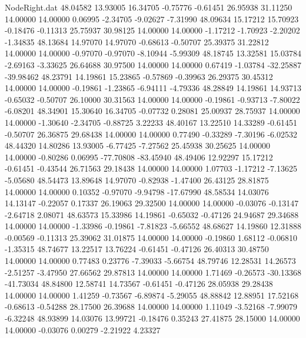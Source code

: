 \begin{filecontents}{NodeRight.dat}
  48.04582   13.93005   16.34705    -0.75776   -0.61451   26.95938   31.11250   14.00000   14.00000    0.06995   -2.34705   -9.02627   -7.31990
  48.09634   15.17212   15.70923    -0.18476   -0.11313   25.75937   30.98125   14.00000   14.00000   -1.17212   -1.70923   -2.20202   -1.34835
  48.13684   14.97070   14.97070    -0.68613   -0.50707   25.39375   31.22812   14.00000   14.00000   -0.97070   -0.97070   -8.10944   -5.99309
  48.18745   13.32581   15.03784    -2.69163   -3.33625   26.64688   30.97500   14.00000   14.00000    0.67419   -1.03784  -32.25887  -39.98462
  48.23791   14.19861   15.23865    -0.57869   -0.39963   26.29375   30.45312   14.00000   14.00000   -0.19861   -1.23865   -6.94111   -4.79336
  48.28849   14.19861   14.93713    -0.65032   -0.50707   26.10000   30.31563   14.00000   14.00000   -0.19861   -0.93713   -7.80022   -6.08201
  48.34901   15.30640   16.34705    -0.07732    0.28081   25.00937   28.75937   14.00000   14.00000   -1.30640   -2.34705   -0.88725    3.22233
  48.40167   13.22510   14.33289    -0.61451   -0.50707   26.36875   29.68438   14.00000   14.00000    0.77490   -0.33289   -7.30196   -6.02532
  48.44320   14.80286   13.93005    -6.77425   -7.27562   25.45938   30.25625   14.00000   14.00000   -0.80286    0.06995  -77.70808  -83.45940
  48.49406   12.92297   15.17212    -0.61451   -0.43544   26.71563   29.18438   14.00000   14.00000    1.07703   -1.17212   -7.13625   -5.05680
  48.54473   13.89648   14.97070    -0.82938   -1.47400   26.43125   28.81875   14.00000   14.00000    0.10352   -0.97070   -9.94798  -17.67990
  48.58534   14.03076   14.13147    -0.22057    0.17337   26.19063   29.32500   14.00000   14.00000   -0.03076   -0.13147   -2.64718    2.08071
  48.63573   15.33986   14.19861    -0.65032   -0.47126   24.94687   29.34688   14.00000   14.00000   -1.33986   -0.19861   -7.81823   -5.66552
  48.68627   14.19860   12.31888    -0.00569   -0.11313   25.39062   31.01875   14.00000   14.00000   -0.19860    1.68112   -0.06810   -1.35315
  48.74677   13.22517   13.76224    -0.61451   -0.47126   26.40313   30.48750   14.00000   14.00000    0.77483    0.23776   -7.39033   -5.66754
  48.79746   12.28531   14.26573    -2.51257   -3.47950   27.66562   29.87813   14.00000   14.00000    1.71469   -0.26573  -30.13368  -41.73034
  48.84800   12.58741   14.73567    -0.61451   -0.47126   28.05938   29.28438   14.00000   14.00000    1.41259   -0.73567   -6.89874   -5.29055
  48.88842   12.88951   17.52168    -0.68613   -0.54288   28.17500   26.39688   14.00000   14.00000    1.11049   -3.52168   -7.99079   -6.32248
  48.93899   14.03076   13.99721    -0.18476    0.35243   27.41875   28.15000   14.00000   14.00000   -0.03076    0.00279   -2.21922    4.23327

\end{filecontents}
